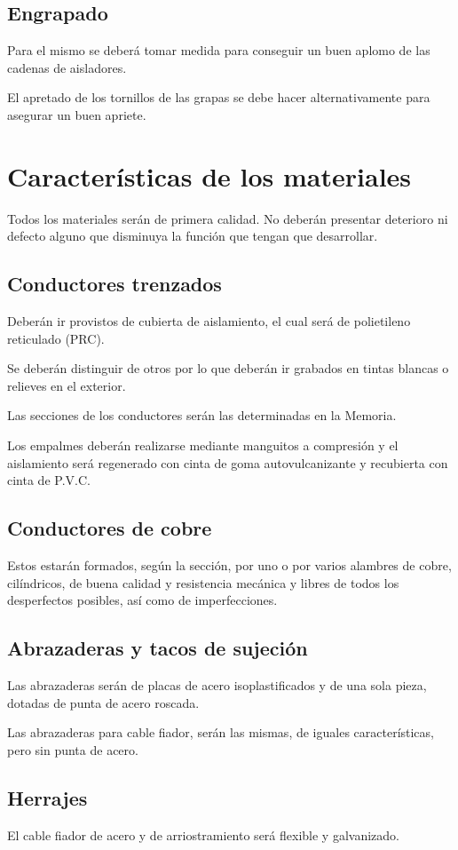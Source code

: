 \subsection{Engrapado}
\label{subsec:pliego-engrapadoCT}
Para el mismo se deberá tomar medida para conseguir un buen aplomo de las cadenas de aisladores.
	
El apretado de los tornillos de las grapas se debe hacer alternativamente para asegurar un buen apriete.
\section{Características de los materiales}
\label{sec:pliego-materiales}
Todos los materiales serán de primera calidad. No deberán presentar deterioro ni defecto alguno que disminuya la función que tengan que desarrollar.
\subsection{Conductores trenzados}
\label{subsec:pliego-trenzadosMAT}
Deberán ir provistos de cubierta de aislamiento, el cual será de polietileno reticulado (PRC).

Se deberán distinguir de otros por lo que deberán ir grabados en tintas blancas o relieves en el exterior.

Las secciones de los conductores serán las determinadas en la Memoria.

Los empalmes deberán realizarse mediante manguitos a compresión y el aislamiento será regenerado con cinta de goma autovulcanizante y recubierta con cinta de P.V.C.
\subsection{Conductores de cobre}
\label{subsec:pliego-cobreMAT}
Estos estarán formados, según la sección, por uno o por varios alambres de cobre, cilíndricos, de buena calidad y resistencia mecánica y libres de todos los desperfectos posibles, así como de imperfecciones.
\subsection{Abrazaderas y tacos de sujeción}
\label{subsec:pliego-abrazaderasMAT}
Las abrazaderas serán de placas de acero isoplastificados y de una sola pieza, dotadas de punta de acero roscada.

Las abrazaderas para cable fiador, serán las mismas, de iguales características, pero sin punta de acero.
\subsection{Herrajes}
\label{subsec:pliego-herrajesMAT}
El cable fiador de acero y de arriostramiento será flexible y galvanizado.

